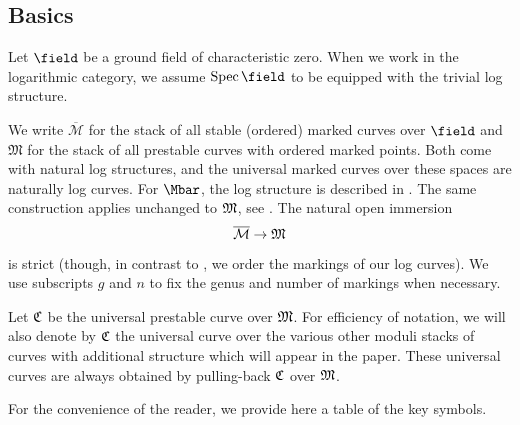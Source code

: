 \documentclass[a4paper,12pt]{article} %
\newcommand{\on}[1]{\operatorname{#1}}
\theoremstyle{definition}
\theoremstyle{plain}%
\newcommand{\Dcomment}[1]{}
\newcommand{\DRop}{\mathsf{DR}^{\mathsf{op}}}
\begin{document}
\subsection{Basics}\label{sec:prestable_vs_log_curves}

Let ${\field}$ be a ground field of characteristic zero. When we work in the logarithmic category, we assume $\on{Spec} {\field}$ to be equipped with the trivial log structure. 

We write $\overline{\mathcal M}$ for the stack of all stable (ordered) marked curves over ${\field}$ 
and $\mathfrak M$ for the stack of all prestable curves with ordered marked points. Both come with natural log structures, and the universal marked curves over these spaces are naturally log curves.
For $\Mbar$, the log structure is described in \cite{Kato2000Log-smooth-defo}. 
The same construction applies unchanged to $\frak M$, see
\cite[Appendix A]{Gross2013Logarithmic-Gro}.
The natural open immersion $$\overline{\mathcal M} \to \frak M$$ is strict (though, in contrast to  \cite{Gross2013Logarithmic-Gro,Kato2000Log-smooth-defo},
we order the markings of our log curves). We use subscripts $g$ and $n$ to fix the genus and number of markings when necessary. 

Let $\frak C$ be
the universal prestable curve over $\frak M$. 
For efficiency of notation, we will also denote by $\frak C$ the universal curve over the various other moduli stacks
of curves with additional structure which
will appear in the paper. 
These universal curves are always obtained by 
pulling-back $\frak C$ over $\frak M$.


For the convenience of the reader, we provide here a table of the key symbols.
\end{document}
